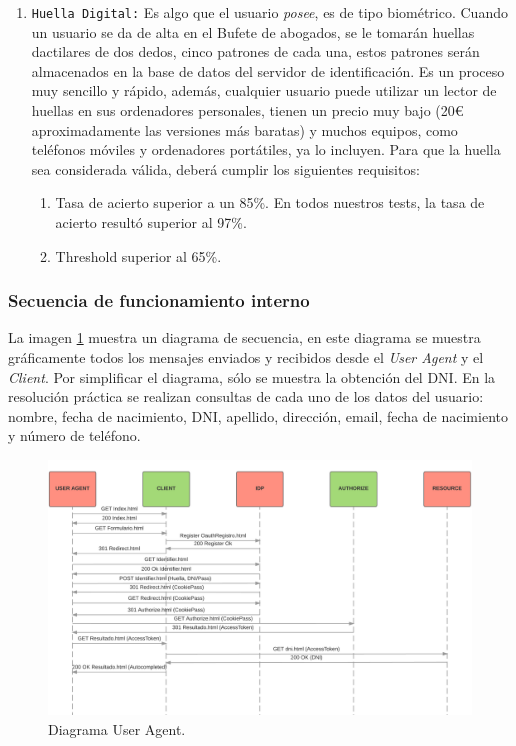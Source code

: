 \documentclass[a4,12pt,onecolum]{article}
\begin{document}
\begin{enumerate}
	\item \texttt{Huella Digital:} Es algo que el usuario \emph{posee}, es de tipo biométrico. Cuando un 			usuario se da de alta en el Bufete de abogados, se le tomarán huellas dactilares de dos dedos, cinco 			patrones de cada una, estos patrones serán almacenados en la base de datos del servidor de identificación. 		Es un proceso muy sencillo y rápido, además, cualquier usuario puede utilizar un lector de huellas en sus 		ordenadores personales, tienen un precio muy bajo (20\euro{} aproximadamente las versiones más baratas) y 		muchos equipos, como teléfonos móviles y ordenadores portátiles, ya lo incluyen. Para que la huella sea considerada válida, deberá cumplir los siguientes requisitos:
	\begin{enumerate}
		\item Tasa de acierto superior a un 85\%. En todos nuestros tests, la tasa de acierto resultó superior 			al 97\%.
		\item Threshold superior al 65\%.
	\end{enumerate}

\end{enumerate}


\subsubsection{Secuencia de funcionamiento interno}
La imagen \ref{fig:oauth2} muestra un diagrama de secuencia, en este diagrama se muestra gráficamente todos los mensajes enviados y recibidos desde el \emph{User Agent} y el \emph{Client}. Por simplificar el diagrama, sólo se muestra la obtención del DNI. En la resolución práctica se realizan consultas de cada uno de los datos del usuario: nombre, fecha de nacimiento, DNI, apellido, dirección, email, fecha de nacimiento y número de teléfono.

\begin{figure}[htbp]
\centering
\includegraphics[width=1.0\textwidth]{./images/oauth/diagrama_flujo_useragent.png}
\caption{Diagrama User Agent.}
\label{fig:oauth2}
\end{figure}
\end{document}
